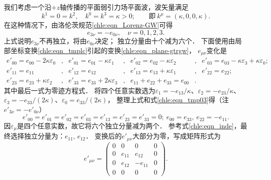 我们考虑一个沿$+z$轴传播的平面弱引力场平面波，波矢量满足
\begin{equation}
    k^1=0=k^2,\quad k^0=k^3=\kappa >0;\qquad
    \text{即}\  k^\mu = (\kappa,0,0,\kappa).
\end{equation}
在这种情况下，由洛伦茨规范\eqref{chle:eqn_Lorenz-GW}可得
\begin{equation}\label{chle:eqn_tmp03}
    e_{3\nu} = -e_{0\nu}, \quad \nu =0,1,2,3 .
\end{equation}
上式说明$e_{3\nu}$不再独立，将由$e_{0\nu}$决定；
独立分量由十个减为六个．
下面使用由局部坐标变换\eqref{chle:eqn_tmplc}引起的变换\eqref{chle:eqn_plane-gtrgw}，
$e_{\mu\nu}$变化是
\setlength{\mathindent}{0em}
\begin{align*}
    e'_{00}=e_{00}- 2 \kappa \varepsilon_0 &,&
    e'_{01}=e_{01}- \kappa \varepsilon_1&,&
    e'_{02}=e_{02}- \kappa \varepsilon_2&, &
    e'_{03}=e_{03}- \kappa \varepsilon_3 + \kappa \varepsilon_0; \\
     e'_{11}= e_{11}&,   &e'_{12}=e_{12}&,   &e'_{13}=e_{13} + \kappa \varepsilon_1&,&
     e'_{22}=e_{22}; \\
      e'_{23}=e_{23} + \kappa \varepsilon_2 &,      &e'_{33}=e_{33}+ 2\kappa \varepsilon_3&,&
     e_{11}+e_{22}+e_{33}=e_{00}&.& {}
\end{align*}\setlength{\mathindent}{2em}
其中最后一式为零迹方程式．
将四个任意实数选为$\varepsilon_1 = - e_{13}/\kappa$、$ \varepsilon_2 = - e_{23}/\kappa$、
$\varepsilon_3 = - e_{33}/(2\kappa)$、$ \varepsilon_0 = e_{33}/(2\kappa) $，
整理上式和式\eqref{chle:eqn_tmp03}得（注$e'_{3\nu} = -e'_{0\nu}$）
\begin{equation}\label{chle:eqn_inde}
     e'_{00}=e'_{01}=e'_{02}=e'_{03}=e'_{13}=e'_{23}=e'_{33}=0;
     \ e_{00}=e_{33}, \ e_{22}=-e_{11} .
\end{equation}
因$\varepsilon_\mu$是四个任意实数，故它将六个独立分量减为两个．
参考式\eqref{chle:eqn_inde}，最终选择独立分量为：$e_{11},\, e_{12}$．
变换后的$e'_{\mu\nu}$大部分为零，写成矩阵形式为
\begin{equation}
e'_{\mu\nu}=
\begin{pmatrix}
   0 & 0 & 0 & 0 \\
   0& e_{11} &  e_{12} & 0 \\
   0& e_{12} & -e_{11} & 0 \\
   0 & 0 & 0 & 0
\end{pmatrix}.
\end{equation}


